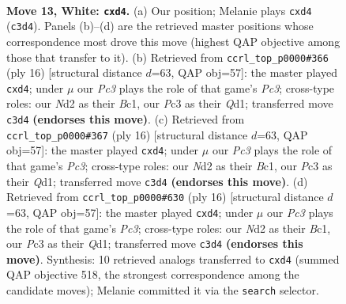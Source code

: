 \documentclass[11pt]{article}
\begin{document}
\clearpage

\begin{figure}[p]\centering
\begin{subfigure}{0.46\textwidth}\centering
\resizebox{\linewidth}{!}{%
\newchessgame
\chessboard[
  setfen={rnbqk2r/1p2p1b1/6p1/p6p/3pB3/2P5/P2N1PPP/R1BQ1RK1 w kq - 0 13},
  showmover=false,
  pgfstyle=straightmove, color=movearrow, markmove={c3-d4}
]}
\caption{}
\end{subfigure}\hfill
\begin{subfigure}{0.46\textwidth}\centering
\resizebox{\linewidth}{!}{%
\newchessgame
\chessboard[
  setfen={rnbqk2r/pp2ppbp/6p1/8/2BpP3/2P5/P3NPPP/R1BQK2R w KQkq - 0 9},
  showmover=false,
  pgfstyle=straightmove, color=movearrow, markmove={c3-d4}
]}
\caption{}
\end{subfigure}
\\[4pt]
\begin{subfigure}{0.46\textwidth}\centering
\resizebox{\linewidth}{!}{%
\newchessgame
\chessboard[
  setfen={rnbqk2r/pp2ppbp/6p1/8/2BpP3/2P5/P3NPPP/R1BQK2R w KQkq - 0 9},
  showmover=false,
  pgfstyle=straightmove, color=movearrow, markmove={c3-d4}
]}
\caption{}
\end{subfigure}\hfill
\begin{subfigure}{0.46\textwidth}\centering
\resizebox{\linewidth}{!}{%
\newchessgame
\chessboard[
  setfen={rnbqk2r/pp2ppbp/6p1/8/2BpP3/2P5/P3NPPP/R1BQK2R w KQkq - 0 9},
  showmover=false,
  pgfstyle=straightmove, color=movearrow, markmove={c3-d4}
]}
\caption{}
\end{subfigure}
\caption{\textbf{Move 13, White: \texttt{cxd4}.} (a) Our position; Melanie plays \texttt{cxd4} (\texttt{c3d4}). Panels (b)--(d) are the retrieved master positions whose correspondence most drove this move (highest QAP objective among those that transfer to it). (b) Retrieved from \texttt{ccrl\_top\_p0000\#366} (ply 16) [structural distance $d$=63, QAP obj=57]: the master played \texttt{cxd4}; under $\mu$ our \emph{Pc3} plays the role of that game's \emph{Pc3}; cross-type roles: our \emph{N}d2 as their \emph{B}c1, our \emph{P}c3 as their \emph{Q}d1; transferred move \texttt{c3d4} \textbf{(endorses this move)}. (c) Retrieved from \texttt{ccrl\_top\_p0000\#367} (ply 16) [structural distance $d$=63, QAP obj=57]: the master played \texttt{cxd4}; under $\mu$ our \emph{Pc3} plays the role of that game's \emph{Pc3}; cross-type roles: our \emph{N}d2 as their \emph{B}c1, our \emph{P}c3 as their \emph{Q}d1; transferred move \texttt{c3d4} \textbf{(endorses this move)}. (d) Retrieved from \texttt{ccrl\_top\_p0000\#630} (ply 16) [structural distance $d$=63, QAP obj=57]: the master played \texttt{cxd4}; under $\mu$ our \emph{Pc3} plays the role of that game's \emph{Pc3}; cross-type roles: our \emph{N}d2 as their \emph{B}c1, our \emph{P}c3 as their \emph{Q}d1; transferred move \texttt{c3d4} \textbf{(endorses this move)}. Synthesis: 10 retrieved analogs transferred to \texttt{cxd4} (summed QAP objective 518, the strongest correspondence among the candidate moves); Melanie committed it via the \texttt{search} selector.}
\label{fig:thought-m24}
\end{figure}
\end{document}
